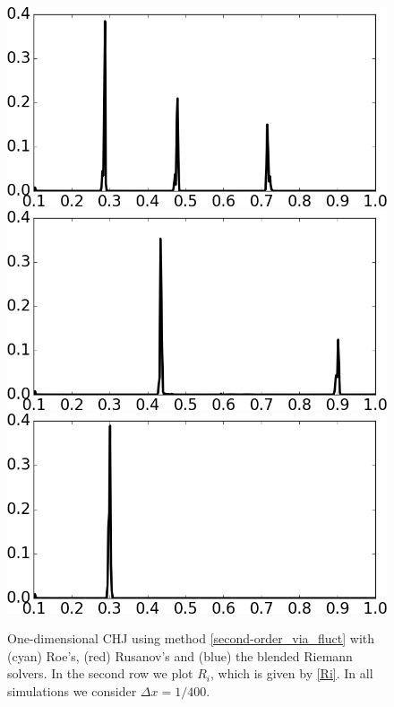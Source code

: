 \documentclass[preprint, 11pt]{article}
\begin{document}
\begin{figure}[!h]
{    \vspace{15pt}
    \includegraphics[scale=0.29]{figures/chj_1D_Ri_t0p5.png}
    \qquad
    \includegraphics[scale=0.29]{figures/chj_1D_Ri_t1p3.png}
    \qquad
    \includegraphics[scale=0.29]{figures/chj_1D_Ri_t10p0.png}
  }
  \caption{
    One-dimensional CHJ using method \eqref{second-order_via_fluct} with 
    (cyan) Roe's, (red) Rusanov's and (blue) the blended Riemann solvers.
    In the second row we plot $R_i$, which is given by \eqref{Ri}.
    In all simulations we consider $\Delta x=1/400$.
    \label{fig:1D_chj}}
\end{figure}
\end{document}

